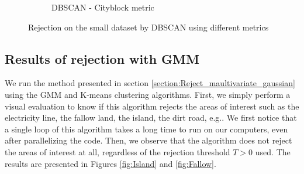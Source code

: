\documentclass{siamart171218}
\begin{document}
\begin{figure}[h!]
\begin{subfigure}[b]{0.33\textwidth}
                \caption{DBSCAN - Cityblock metric}
                \label{DBSCAN_Cityblock}
        \end{subfigure}%
        \caption{Rejection on the small dataset by DBSCAN using different metrics }\label{Res_DBSCAN}
\end{figure}


\subsection{Results of rejection with GMM}

We run the method presented in section \ref{section:Reject_maultivariate_gaussian} using the GMM and K-means clustering algorithms. First, we simply perform a visual evaluation to know if this algorithm rejects the areas of interest such as the electricity line, the fallow land, the island, the dirt road, e.g.. 
We first notice that a single loop of this algorithm takes a long time to run on our computers, even after parallelizing the code. Then, we observe that the algorithm does not reject the areas of interest at all, regardless of the rejection threshold $T > 0$ used. The results are presented in Figures \ref{fig:Island} and \ref{fig:Fallow}.
\end{document}
